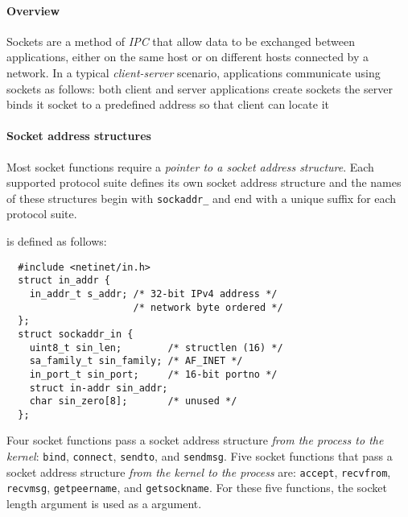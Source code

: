 \documentclass{memo}
\begin{document}
\small
{}

\paragraph{Overview} Sockets are a method of {\em IPC\/} that allow data to be
exchanged between applications, either on the same host or on different hosts
connected by a network. 
In a typical {\em client-server\/} scenario, applications communicate using
sockets as follows:
\bit
\w both client and server applications create sockets
\w the server binds it socket to a predefined address so that client can
locate it
\eit

\paragraph{Socket address structures}
Most socket functions require a {\em pointer to a socket address
  structure\/}. Each supported protocol suite defines its own socket address
structure and the names of these structures begin with \verb+sockaddr_+ and
end with a unique suffix for each protocol suite.

 is defined as follows:
\begin{verbatim}
  #include <netinet/in.h>
  struct in_addr {
    in_addr_t s_addr; /* 32-bit IPv4 address */
                      /* network byte ordered */
  };
  struct sockaddr_in {
    uint8_t sin_len;        /* structlen (16) */
    sa_family_t sin_family; /* AF_INET */
    in_port_t sin_port;     /* 16-bit portno */
    struct in-addr sin_addr; 
    char sin_zero[8];       /* unused */
  };
\end{verbatim}

Four socket functions pass a socket address structure {\em from the process to
  the kernel\/}: \verb+bind+, \verb+connect+, \verb+sendto+, and
\verb+sendmsg+. Five socket functions that pass a socket address structure
{\em from the kernel to the process\/} are: \verb+accept+, \verb+recvfrom+,
\verb+recvmsg+, \verb+getpeername+, and \verb+getsockname+.  For these five
functions, the socket length argument is used as a  argument.
\end{document}
